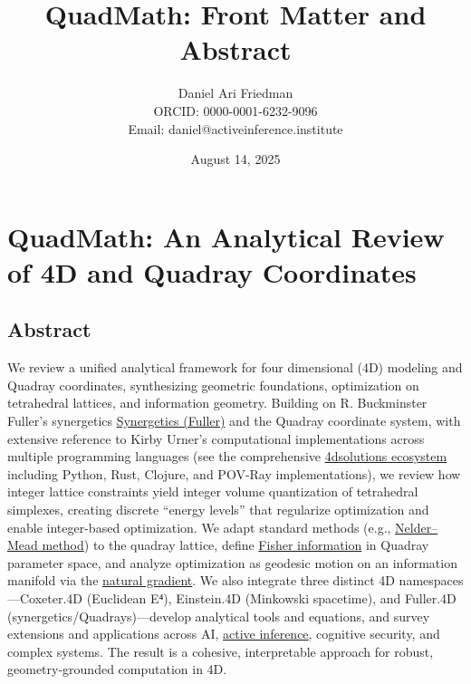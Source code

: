 \documentclass[
  10pt,
]{article}
\title{QuadMath: Front Matter and Abstract}
\author{Daniel Ari Friedman\\ ORCID: 0000-0001-6232-9096\\ Email: daniel@activeinference.institute}
\date{August 14, 2025}
\begin{document}
\maketitle

{
\hypersetup{linkcolor=red}
\setcounter{tocdepth}{3}
\tableofcontents
}
\hypertarget{quadmath-an-analytical-review-of-4d-and-quadray-coordinates}{%
\section{QuadMath: An Analytical Review of 4D and Quadray
Coordinates}\label{quadmath-an-analytical-review-of-4d-and-quadray-coordinates}}

\hypertarget{abstract}{%
\subsection{Abstract}\label{abstract}}

We review a unified analytical framework for four dimensional (4D)
modeling and Quadray coordinates, synthesizing geometric foundations,
optimization on tetrahedral lattices, and information geometry. Building
on R. Buckminster Fuller's synergetics
\href{https://en.wikipedia.org/wiki/Synergetics_(Fuller)}{Synergetics
(Fuller)} and the Quadray coordinate system, with extensive reference to
Kirby Urner's computational implementations across multiple programming
languages (see the comprehensive
\href{https://github.com/4dsolutions}{4dsolutions ecosystem} including
Python, Rust, Clojure, and POV-Ray implementations), we review how
integer lattice constraints yield integer volume quantization of
tetrahedral simplexes, creating discrete ``energy levels'' that
regularize optimization and enable integer-based optimization. We adapt
standard methods (e.g.,
\href{https://en.wikipedia.org/wiki/Nelder\%E2\%80\%93Mead_method}{Nelder--Mead
method}) to the quadray lattice, define
\href{https://en.wikipedia.org/wiki/Fisher_information}{Fisher
information} in Quadray parameter space, and analyze optimization as
geodesic motion on an information manifold via the
\href{https://en.wikipedia.org/wiki/Natural_gradient}{natural gradient}.
We also integrate three distinct 4D namespaces---Coxeter.4D (Euclidean
E⁴), Einstein.4D (Minkowski spacetime), and Fuller.4D
(synergetics/Quadrays)---develop analytical tools and equations, and
survey extensions and applications across AI,
\href{https://welcome.activeinference.institute/}{active inference},
cognitive security, and complex systems. The result is a cohesive,
interpretable approach for robust, geometry-grounded computation in 4D.
\end{document}

